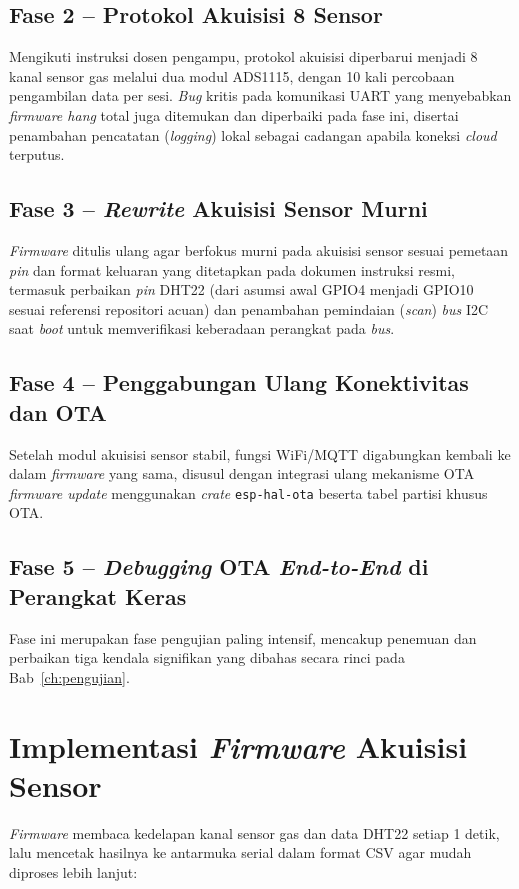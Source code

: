 \documentclass[12pt,a4paper]{report}
\begin{document}
\subsection{Fase 2 -- Protokol Akuisisi 8 Sensor}
Mengikuti instruksi dosen pengampu, protokol akuisisi diperbarui menjadi 8 kanal
sensor gas melalui dua modul ADS1115, dengan 10 kali percobaan pengambilan data per
sesi. \textit{Bug} kritis pada komunikasi UART yang menyebabkan \textit{firmware hang} total
juga ditemukan dan diperbaiki pada fase ini, disertai penambahan pencatatan
(\textit{logging}) lokal sebagai cadangan apabila koneksi \textit{cloud} terputus.

\subsection{Fase 3 -- \textit{Rewrite} Akuisisi Sensor Murni}
\textit{Firmware} ditulis ulang agar berfokus murni pada akuisisi sensor sesuai pemetaan \textit{pin}
dan format keluaran yang ditetapkan pada dokumen instruksi resmi, termasuk perbaikan
\textit{pin} DHT22 (dari asumsi awal GPIO4 menjadi GPIO10 sesuai referensi repositori acuan)
dan penambahan pemindaian (\textit{scan}) \textit{bus} I2C saat \textit{boot} untuk memverifikasi
keberadaan perangkat pada \textit{bus}.

\subsection{Fase 4 -- Penggabungan Ulang Konektivitas dan OTA}
Setelah modul akuisisi sensor stabil, fungsi WiFi/MQTT digabungkan kembali ke dalam
\textit{firmware} yang sama, disusul dengan integrasi ulang mekanisme OTA \textit{firmware update}
menggunakan \textit{crate} \texttt{esp-hal-ota} beserta tabel partisi khusus OTA.

\subsection{Fase 5 -- \textit{Debugging} OTA \textit{End-to-End} di Perangkat Keras}
Fase ini merupakan fase pengujian paling intensif, mencakup penemuan dan perbaikan
tiga kendala signifikan yang dibahas secara rinci pada Bab~\ref{ch:pengujian}.

\section{Implementasi \textit{Firmware} Akuisisi Sensor}
\textit{Firmware} membaca kedelapan kanal sensor gas dan data DHT22 setiap 1 detik, lalu
mencetak hasilnya ke antarmuka serial dalam format CSV agar mudah diproses lebih
lanjut:
\end{document}
